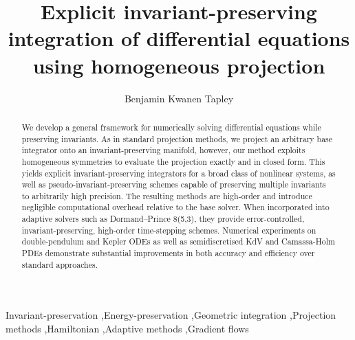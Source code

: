 \documentclass[final,3p,times]{elsarticle}
\begin{document}
\begin{frontmatter}

\title{Explicit invariant-preserving integration of differential equations using homogeneous projection}

\author[sintef]{Benjamin Kwanen Tapley}


\begin{abstract}
We develop a general framework for numerically solving differential equations while preserving invariants. As in standard projection methods, we project an arbitrary base integrator onto an invariant-preserving manifold, however, our method exploits homogeneous symmetries to evaluate the projection exactly and in closed form. This yields explicit invariant-preserving integrators for a broad class of nonlinear systems, as well as pseudo-invariant-preserving schemes capable of preserving multiple invariants to arbitrarily high precision. The resulting methods are high-order and introduce negligible computational overhead relative to the base solver. When incorporated into adaptive solvers such as Dormand–Prince 8(5,3), they provide error-controlled, invariant-preserving, high-order time-stepping schemes. Numerical experiments on double-pendulum and Kepler ODEs as well as semidiscretised KdV and Camassa-Holm PDEs demonstrate substantial improvements in both accuracy and efficiency over standard approaches.
\end{abstract}

\begin{keyword}
Invariant-preservation \sep Energy-preservation \sep Geometric integration \sep Projection methods \sep Hamiltonian \sep Adaptive methods \sep Gradient flows 
\end{keyword}

\end{frontmatter}
\end{document}
